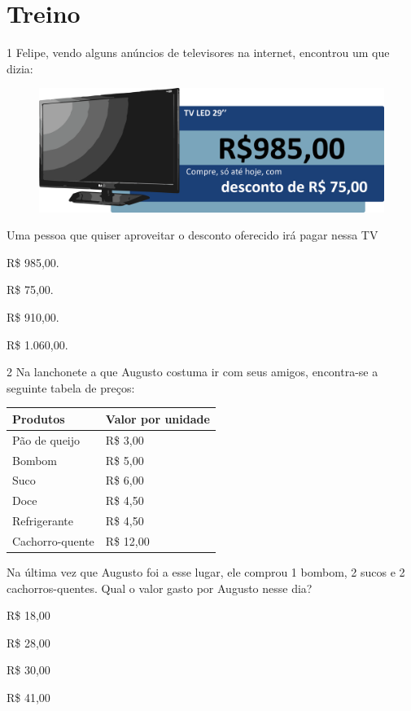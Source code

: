 \pagebreak
\section*{Treino}

\num{1} Felipe, vendo alguns anúncios de televisores na internet, encontrou um que dizia:

\begin{figure}[htpb!]
\centering
\includegraphics[width=.8\textwidth]{./media/image73.png}
\end{figure}

Uma pessoa que quiser aproveitar o desconto oferecido irá pagar nessa TV

\begin{escolha}
\item
  R\$ 985,00.
\item
  R\$ 75,00.
\item
  R\$ 910,00.
\item
  R\$ 1.060,00.
\end{escolha}

\num{2} Na lanchonete a que Augusto costuma ir com seus amigos, encontra-se a
seguinte tabela de preços:

\begin{longtable}[]{@{}ll@{}}
\toprule
\hline
\textbf{Produtos} & \textbf{Valor por unidade}\tabularnewline
\hline
\midrule
\endhead
Pão de queijo & R\$ 3,00\tabularnewline
\hline
Bombom & R\$ 5,00\tabularnewline
\hline
Suco & R\$ 6,00\tabularnewline
\hline
Doce & R\$ 4,50\tabularnewline
\hline
Refrigerante & R\$ 4,50\tabularnewline
\hline
Cachorro-quente & R\$ 12,00\tabularnewline
\bottomrule
\end{longtable}

Na última vez que Augusto foi a esse lugar, ele comprou 1 bombom, 2
sucos e 2 cachorros-quentes. Qual o valor gasto por Augusto nesse dia?

\begin{escolha}

\item
  R\$ 18,00
\item
  R\$ 28,00
\item
  R\$ 30,00
\item
  R\$ 41,00
\end{escolha}

